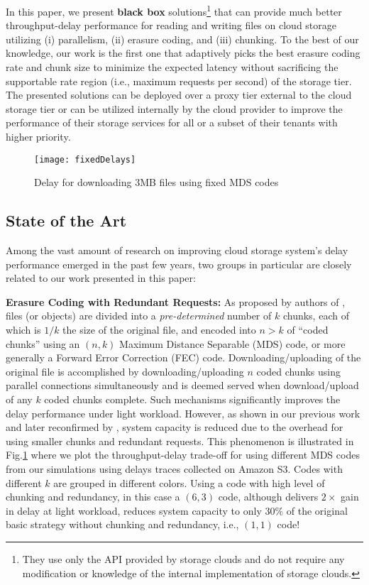 \documentclass[journal]{IEEEtran}
\newcommand{\onewidth}{0.74\columnwidth}
\begin{document}
In this paper, we present  {\bf black box} solutions\footnote{They use only the API provided by storage clouds and do not require any modification or knowledge of the internal implementation of storage clouds.} that can provide much better throughput-delay performance for reading and writing files on cloud storage utilizing (i) parallelism, (ii) erasure coding, and (iii) chunking. To the best of our knowledge, our work is the first one that adaptively picks the best erasure coding rate and chunk size to minimize the expected latency without sacrificing the supportable rate region (i.e., maximum requests per second) of the storage tier.  The presented solutions can be deployed over a proxy tier external to the cloud storage tier or can be utilized internally by the cloud provider to improve the performance of their storage services for all or a subset of their tenants with higher priority.





\begin{figure}[!t]
\centering
\texttt{[image: fixedDelays]}
\caption{Delay for downloading 3MB files using fixed MDS codes}
\label{fig:fixedDelays}
\end{figure}

\subsection{State of the Art}
Among the vast amount of research on improving cloud storage system's delay performance emerged in the past few years, two groups in particular are closely related to our work presented in this paper:

{\bf Erasure Coding with Redundant Requests:} As proposed by authors of \cite{fastcloud,Longbocodeingincloud, MDS-queue}, files (or objects) are divided into a {\em pre-determined} number of $k$ chunks, each of which is $1/k$ the size of the original file, and encoded into $n>k$ of ``coded chunks'' using an $(n,k)$ Maximum Distance Separable (MDS) code, or more generally a Forward Error Correction (FEC) code. Downloading/uploading of the original file is accomplished by downloading/uploading $n$ coded chunks using parallel connections simultaneously and is deemed served when download/upload of any $k$ coded chunks complete. Such mechanisms significantly improves the delay performance under light workload. However, as shown in our previous work \cite{fastcloud} and later reconfirmed by \cite{MDS-queue}, system capacity is reduced due to the overhead for using smaller chunks and redundant requests. This phenomenon is illustrated in Fig.\ref{fig:fixedDelays} where we plot the throughput-delay trade-off for using different MDS codes from our simulations using delays traces collected on Amazon S3. Codes with different $k$ are grouped in different colors. Using a code with high level of chunking and redundancy, in this case a $(6,3)$ code, although delivers $2\times$ gain in delay at light workload, reduces system capacity to only $30\%$ of the original basic strategy without chunking and redundancy, i.e., $(1,1)$ code!
\end{document}
